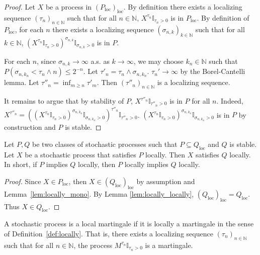 \begin{proof}
Let $X$ be a process in $(P_{\mathrm{loc}})_{\mathrm{loc}}$.
By definition there exists a localizing sequence $(\tau_n)_{n \in \mathbb{N}}$ such that for all $n \in \mathbb{N}$, $X^{\tau_n}\mathbb{I}_{\tau_n > 0}$ is in $P_{\mathrm{loc}}$.
By definition of $P_{\mathrm{loc}}$, for each $n$ there exists a localizing sequence $(\sigma_{n,k})_{k \in \mathbb{N}}$ such that for all $k \in \mathbb{N}$, $(X^{\tau_n}\mathbb{I}_{\tau_n > 0})^{\sigma_{n,k}}\mathbb{I}_{\sigma_{n,k} > 0}$ is in $P$.

For each $n$, since $\sigma_{n,k} \to \infty$ a.s. as $k \to \infty$, we may choose $k_n \in \mathbb{N}$ such that $P(\sigma_{n,k_n} < \tau_n \wedge n) \le 2^{-n}$.
Let $\tau'_n = \tau_n \wedge \sigma_{n,k_n}$. $\tau_n' \to \infty$ by the Borel-Cantelli lemma.
Let $\tau''_n = \inf_{m \ge n} \tau'_m$.
Then $(\tau''_n)_{n \in \mathbb{N}}$ is a localizing sequence.

It remains to argue that by stability of $P$, $X^{\tau''_n}\mathbb{I}_{\tau''_n > 0}$ is in $P$ for all $n$.
Indeed, $X^{\tau''_n} = ((X^{\tau_n}\mathbb{I}_{\tau_n > 0})^{\sigma_{n,k_n}}\mathbb{I}_{\sigma_{n,k_n} > 0})^{\tau''_n}\mathbb{I}_{\tau''_n > 0}$. $(X^{\tau_n}\mathbb{I}_{\tau_n > 0})^{\sigma_{n,k_n}}\mathbb{I}_{\sigma_{n,k_n} > 0}$ is in $P$ by construction and $P$ is stable.
\end{proof}


\begin{lemma}\label{lem:local_induction}
  \leanok
Let $P, Q$ be two classes of stochastic processes such that $P \subseteq Q_{\mathrm{loc}}$ and $Q$ is stable.
Let $X$ be a stochastic process that satisfies $P$ locally.
Then $X$ satisfies $Q$ locally.
In short, if $P$ implies $Q$ locally, then $P$ locally implies $Q$ locally.
\end{lemma}

\begin{proof}\leanok
Since $X \in P_{\mathrm{loc}}$, then $X \in (Q_{\mathrm{loc}})_{\mathrm{loc}}$ by assumption and Lemma~\ref{lem:locally_mono}.
By Lemma \ref{lem:locally_locally}, $(Q_{\mathrm{loc}})_{\mathrm{loc}} = Q_{\mathrm{loc}}$.
Thus $X \in Q_{\mathrm{loc}}$.
\end{proof}


\begin{definition}\label{def:IsLocalMartingale}
  \leanok
A stochastic process is a local martingale if it is locally a martingale in the sense of Definition~\ref{def:locally}.
That is, there exists a localizing sequence $(\tau_n)_{n \in \mathbb{N}}$ such that for all $n \in \mathbb{N}$, the process $M^{\tau_n}\mathbb{I}_{\tau_n > 0}$ is a martingale.
\end{definition}


